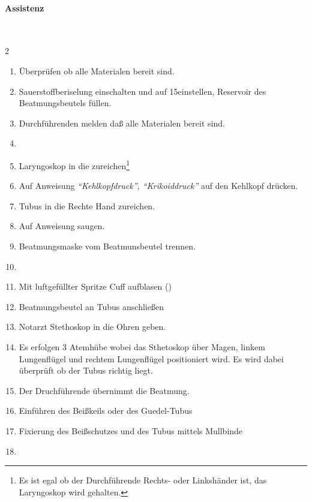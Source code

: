 \paragraph*{Assistenz}~
\begin{multicols}{2}


\begin{enumerate}
    \item Überprüfen ob alle Materialen bereit sind.
    \item Sauerstoffberiselung einschalten und auf 15\gLMin einstellen,
    Reservoir des Beatmungsbeutels füllen. 
    \item Durchführenden melden daß alle Materialen bereit sind.
    \item {}
    \item Laryngoskop in die  zureichen\footnote{Es ist egal ob
    der Durchführende Rechts- oder Linkshänder ist, das Laryngoskop wird
     gehalten.}
    \item Auf Anweisung \emph{"`Kehlkopfdruck"', "`Krikoiddruck"'} auf den
    Kehlkopf drücken.
    \item Tubus in die Rechte Hand zureichen.
    \item Auf Anweisung saugen.
    \item Beatmungsmaske vom Beatmunsbeutel trennen.
    \item {}
    \item Mit luftgefüllter Spritze Cuff aufblasen ()
    \item Beatmungsbeutel an Tubus anschließen
    \item Notarzt Stethoskop in die Ohren geben. 
    \item Es erfolgen 3 Atemhübe wobei das Sthetoskop über Magen, linkem
    Lungenflügel und rechtem Lungenflügel positioniert wird. Es wird dabei
    überprüft ob der Tubus richtig liegt. 
    \item Der Druchführende übernimmt die Beatmung. 
    \item Einführen des Beißkeils oder des Guedel-Tubus
    \item Fixierung des Beißschutzes und des Tubus mittels Mullbinde
    \item {}
\end{enumerate}
\end{multicols}



